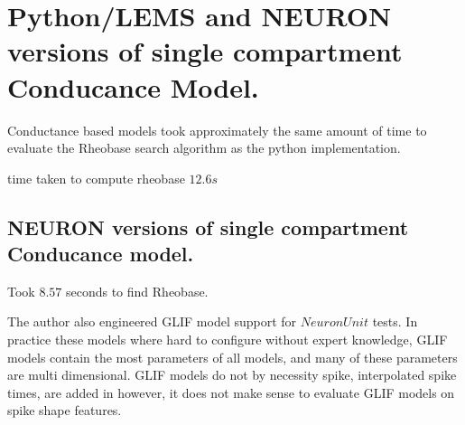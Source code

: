 \section{Python/LEMS and NEURON versions of single compartment Conducance Model.}

Conductance based models took approximately the same amount of
time to evaluate the Rheobase search algorithm as the python
implementation.


time taken to compute rheobase $ 12.6s $




\subsection{NEURON versions of single compartment Conducance
model.}




Took $8.57$ seconds to find Rheobase.

The author also engineered GLIF model support for $NeuronUnit$ tests. In practice these models where hard to configure without expert knowledge, GLIF models contain the most parameters of all models, and many of these parameters are multi dimensional. GLIF models do not by necessity spike, interpolated spike times, are added in however, it does not make sense to evaluate GLIF models on spike shape features.


